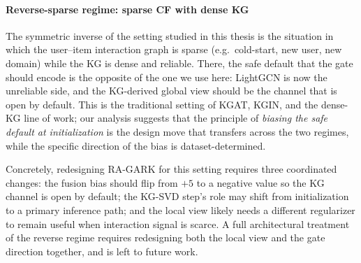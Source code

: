 \paragraph{Reverse-sparse regime: sparse CF with dense KG} The symmetric inverse of the setting studied in this thesis is the situation in which the user--item interaction graph is sparse (e.g.\ cold-start, new user, new domain) while the KG is dense and reliable. There, the safe default that the gate should encode is the opposite of the one we use here: LightGCN is now the unreliable side, and the KG-derived global view should be the channel that is open by default. This is the traditional setting of KGAT, KGIN, and the dense-KG line of work; our analysis suggests that the principle of \emph{biasing the safe default at initialization} is the design move that transfers across the two regimes, while the specific direction of the bias is dataset-determined.

Concretely, redesigning RA-GARK for this setting requires three coordinated changes: the fusion bias should flip from $+5$ to a negative value so the KG channel is open by default; the KG-SVD step's role may shift from initialization to a primary inference path; and the local view likely needs a different regularizer to remain useful when interaction signal is scarce. A full architectural treatment of the reverse regime requires redesigning both the local view and the gate direction together, and is left to future work.
